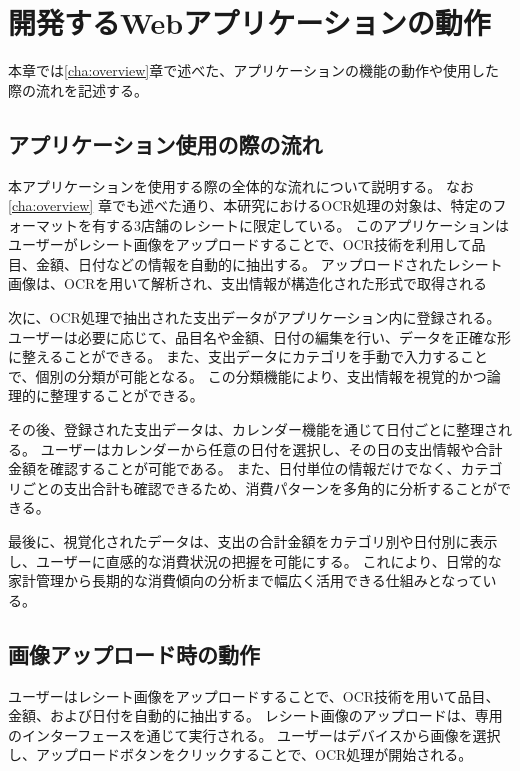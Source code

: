 \documentclass[main]{subfiles}
\begin{document}
\chapter{開発するWebアプリケーションの動作}
\label{cha:motion}
本章では\ref{cha:overview}章で述べた、アプリケーションの機能の動作や使用した際の流れを記述する。

\section{アプリケーション使用の際の流れ}

本アプリケーションを使用する際の全体的な流れについて説明する。
なお\ref{cha:overview} 章でも述べた通り、本研究におけるOCR処理の対象は、特定のフォーマットを有する3店舗のレシートに限定している。
このアプリケーションはユーザーがレシート画像をアップロードすることで、OCR技術を利用して品目、金額、日付などの情報を自動的に抽出する。
アップロードされたレシート画像は、OCRを用いて解析され、支出情報が構造化された形式で取得される

次に、OCR処理で抽出された支出データがアプリケーション内に登録される。
ユーザーは必要に応じて、品目名や金額、日付の編集を行い、データを正確な形に整えることができる。
また、支出データにカテゴリを手動で入力することで、個別の分類が可能となる。
この分類機能により、支出情報を視覚的かつ論理的に整理することができる。

その後、登録された支出データは、カレンダー機能を通じて日付ごとに整理される。
ユーザーはカレンダーから任意の日付を選択し、その日の支出情報や合計金額を確認することが可能である。
また、日付単位の情報だけでなく、カテゴリごとの支出合計も確認できるため、消費パターンを多角的に分析することができる。

最後に、視覚化されたデータは、支出の合計金額をカテゴリ別や日付別に表示し、ユーザーに直感的な消費状況の把握を可能にする。
これにより、日常的な家計管理から長期的な消費傾向の分析まで幅広く活用できる仕組みとなっている。

\section{画像アップロード時の動作}

ユーザーはレシート画像をアップロードすることで、OCR技術を用いて品目、金額、および日付を自動的に抽出する。
レシート画像のアップロードは、専用のインターフェースを通じて実行される。
ユーザーはデバイスから画像を選択し、アップロードボタンをクリックすることで、OCR処理が開始される。

\end{document}
